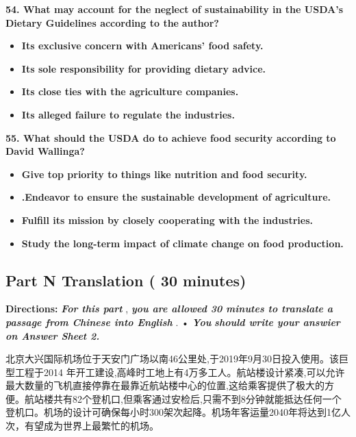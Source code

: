 \documentclass[UTF8,11pt]{ctexart}
\begin{document}
\textbf{54. What may account for the neglect of sustainability in the USDA's Dietary Guidelines according to the} \textbf{author?}


\begin{itemize}[leftmargin=2em,itemsep=.2em,topsep=.4em]\item[A.] \textbf{Its exclusive concern with Americans' food safety.}
\item[B.] \textbf{Its sole responsibility for providing dietary advice.}
\item[C.] \textbf{Its close ties with the agriculture companies.}
\item[D.] \textbf{Its alleged failure to regulate the industries.}
\end{itemize}

\textbf{55. What should the USDA do to achieve food security according to David Wallinga?}


\begin{itemize}[leftmargin=2em,itemsep=.2em,topsep=.4em]\item[A.] \textbf{Give top priority to things like nutrition and food security.}
\item[B.] \textbf{.Endeavor to ensure the sustainable development of agriculture.}
\item[C.] \textbf{Fulfill its mission by closely cooperating with the industries.}
\item[D.] \textbf{Study the long-term impact of climate change on food production.}
\end{itemize}

\subsection*{\textbf{Part N} \textbf{Translation} \textbf{( 30 minutes)}}


\textbf{Directions: }\textbf{\textit{For this part }}, \textbf{\textit{you are allowed 30 minutes to translate a passage from Chinese into English }}. • \textbf{\textit{You}} \textbf{\textit{should write your answier on Answer Sheet 2.}}


北京大兴国际机场位于天安门广场以南46公里处,于2019年9月30日投入使用。该巨型工程于2014 年开工建设,高峰时工地上有4万多工人。航站楼设计紧凑,可以允许最大数量的飞机直接停靠在最靠近航站楼中心的位置,这给乘客提供了极大的方便。航站楼共有82个登机口,但乘客通过安检后,只需不到8分钟就能抵达任何一个登机口。机场的设计可确保每小时300架次起降。机场年客运量2040年将达到1亿人次，有望成为世界上最繁忙的机场。
\end{document}
